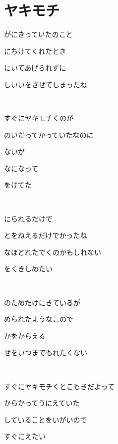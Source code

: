 \section{ヤキモチ}

がにきっていたのこと

にちけてくれたとき

にいてあげられずに

しいいをさせてしまったね

~

すぐにヤキモチくのが

のいだってかっていたなのに

ないが

なになって

をけてた

~

にられるだけで

とをねえるだけでかったね


なほどれたでくのかもしれない

をくきしめたい

~

のためだけにきているが

められたようなこので

かをからえる

せをいつまでもれたくない

~

すぐにヤキモチくとこもきだよって

からかってうにえていた

していることをいがいので

すぐにえたい

